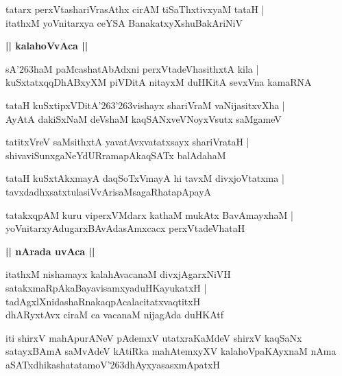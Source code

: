 \documentclass[twoside,12pt,openright]{book}
\def\S{\char'263}
\newcounter{shloka}[chapter]
\def\uvaca#1{\centerline{{\large\textbf{#1}}}}
\begin{document}
\begin{shloka}%
tatarx perxVtashariVrasAthx cirAM tiSaThxtivxyaM tataH |\\
itathxM yoVnitarxya ceYSA BanakatxyXshuBakAriNiV 
\end{shloka}

\uvaca{|| kalahoVvAca ||}

\begin{shloka}%
sA\S haM paMcashatAbAdxni perxVtadeVhasithxtA kila |\\
kuSxtatxqqDhABxyXM piVDitA nitayxM duHKitA sevxVna kamaRNA
\end{shloka}

\begin{shloka}%
tataH kuSxtipxVDitA\S\S vishayx shariVraM vaNijasitxvXha |\\
AyAtA dakiSxNaM deVshaM kaqSANxveVNoyxVsutx saMgameV 
\end{shloka}

\begin{shloka}%
tatitxVreV saMsithxtA yavatAvxvatatxsayx shariVrataH |\\
shivaviSunxgaNeYdURramapAkaqSATx balAdahaM 
\end{shloka}

\begin{shloka}%
tataH kuSxtAkxmayA daqSoTxVmayA hi tavxM divxjoVtatxma |\\
tavxdadhxsatxtulasiVvArisaMsagaRhatapApayA
\end{shloka}

\begin{shloka}%
tatakxqpAM kuru viperxVMdarx kathaM mukAtx BavAmayxhaM |\\
yoVnitarxyAdugarxBAvAdasAmxcacx perxVtadeVhataH 
\end{shloka}

\uvaca{|| nArada uvAca ||}

\begin{shloka}%
itathxM nishamayx kalahAvacanaM divxjAgarxNiVH \\
satakxmaRpAkaBayavisamxyaduHKayukatxH |\\
tadAgxlXnidashaRnakaqpAcalacitatxvaqtitxH \\
dhARyxtAvx ciraM ca vacanaM nijagAda duHKAtf
\end{shloka}

\begin{center}
iti shirxV mahApurANeV pAdemxV utatxraKaMdeV shirxV kaqSaNx satayxBAmA saMvAdeV kAtiRka 
mahAtemxyXV kalahoVpaKAyxnaM nAma aSATxdhikashatatamoV\S dhAyxyasasxmApatxH 
\end{center}
\end{document}
